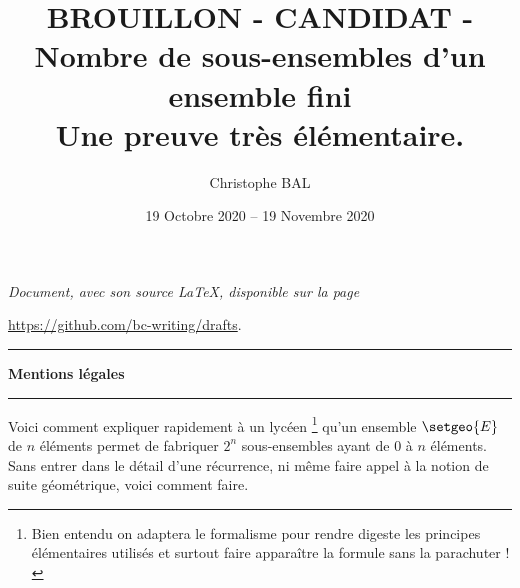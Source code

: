\documentclass[12pt]{amsart}
\begin{document}
\title{BROUILLON - CANDIDAT - Nombre de sous-ensembles d'un ensemble fini\\Une preuve très élémentaire.}
\author{Christophe BAL}
\date{19 Octobre 2020 -- 19 Novembre 2020}


\maketitle

\begin{center}
	\itshape
	Document, avec son source \LaTeX, disponible sur la page
	
	\url{https://github.com/bc-writing/drafts}.
\end{center}


\bigskip


\begin{center}
	\hrule\vspace{.3em}
	{
		\fontsize{1.35em}{1em}\selectfont
		\textbf{Mentions \og légales \fg}
	}
			
	\vspace{0.45em}
	\doclicenseThis
	\hrule
\end{center}


\bigskip



Voici comment expliquer rapidement à un lycéen
\footnote{
	Bien entendu on adaptera le formalisme pour rendre digeste les principes élémentaires utilisés et surtout faire apparaître la formule sans la parachuter !
}
qu'un ensemble $\setgeo{E}$ de $n$ éléments permet de fabriquer $2^n$ sous-ensembles ayant de $0$ à $n$ éléments. Sans entrer dans le détail d'une récurrence, ni même faire appel à la notion de suite géométrique, voici comment faire.
\end{document}

